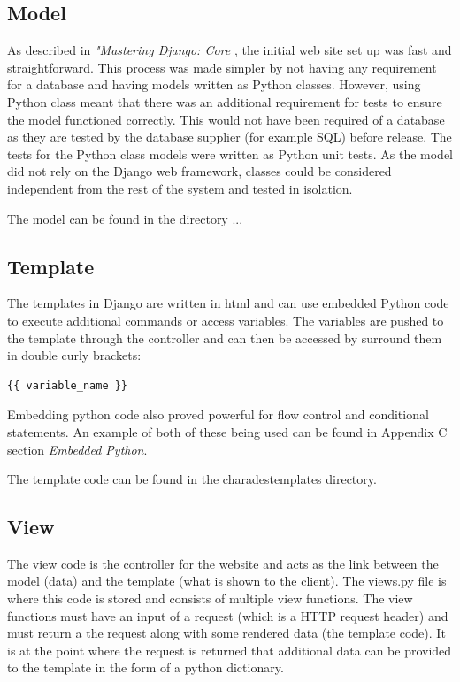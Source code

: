 \subsection{Model}
As described in \textit{"Mastering Django: Core} \cite{django_book}, the initial web site set up was fast and straightforward. This process was made simpler by not having any requirement for a database and having models written as Python classes. However, using Python class meant that there was an additional requirement for tests to ensure the model functioned correctly. This would not have been required of a database as they are tested by the database supplier (for example SQL) before release. The tests for the Python class models were written as Python unit tests. As the model did not rely on the Django web framework, classes could be considered independent from the rest of the system and tested in isolation.

The model can be found in the directory ...

\subsection{Template}
The templates in Django are written in html and can use embedded Python code to execute additional commands or access variables. The variables are pushed to the template through the controller and can then be accessed by surround them in double curly brackets:
\begin{verbatim}
{{ variable_name }}
\end{verbatim}

Embedding python code also proved powerful for flow control and conditional statements. An example of both of these being used can be found in Appendix C section \textit{Embedded Python}.

The template code can be found in the charades\/templates directory.

\subsection{View}
The view code is the controller for the website and acts as the link between the model (data) and the template (what is shown to the client). The views.py file is where this code is stored and consists of multiple view functions. The view functions must have an input of a request (which is a HTTP request header) and must return a the request along with some rendered data (the template code). It is at the point where the request is returned that additional data can be provided to the template in the form of a python dictionary.

